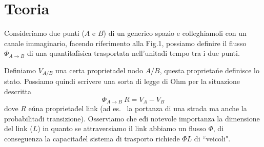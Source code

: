 \documentclass[12pt, a4paper]{book}
\theoremstyle{theorem}
\begin{document}
		\section{Teoria}
			Consideriamo due punti ($A$ e $B$) di un generico spazio e colleghiamoli con un canale immaginario, facendo riferimento alla Fig.1, possiamo definire il flusso $\Phi_{A \rightarrow B}$ di una quantita\' fisica trasportata nell'unita\' di tempo tra i due punti.
			\begin{figure}[ht!]
					\centering
					\caption{}
			\end{figure}
			Definiamo $V_{A/B}$ una certa proprieta\' del nodo $A/B$, questa proprieta\' ne definisce lo stato. Possiamo quindi scrivere una sorta di legge di Ohm per la situazione descritta 
			\begin{equation*}
					\Phi_{A \rightarrow B} \ R = V_A - V_B
			\end{equation*} dove $R$ e\' una proprieta\' del link (ad es. \ la portanza di una strada ma anche la probabilita\' di transizione).
			Osserviamo che e\' di notevole importanza la dimensione del link ($L$) in quanto se attraversiamo il link abbiamo un flusso $\Phi$, di conseguenza la capacita\' del sistema di trasporto richiede $\Phi L$ di “veicoli".			
			\begin{figure}[ht!]
					\centering
					\caption{}
			\end{figure}
\end{document}

